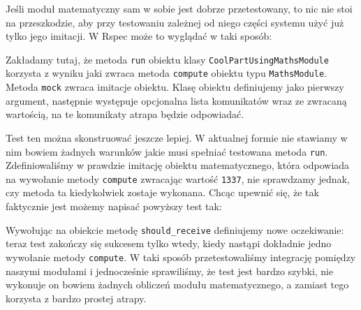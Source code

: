     Jeśli moduł matematyczny sam w sobie jest dobrze przetestowany, to nic nie stoi na przeszkodzie, aby przy testowaniu zależnej od niego części systemu użyć już tylko jego imitacji. W Rspec może to wyglądać w taki sposób:
    
    
    
    Zakładamy tutaj, że metoda \verb+run+ obiektu klasy \verb+CoolPartUsingMathsModule+ korzysta z wyniku jaki zwraca metoda \verb+compute+ obiektu typu \verb+MathsModule+. Metoda \verb+mock+ zwraca imitacje obiektu. Klasę obiektu definiujemy jako pierwszy argument, następnie występuje opcjonalna lista komunikatów wraz ze zwracaną wartością, na te komunikaty atrapa będzie odpowiadać.
    
    Test ten można skonstruować jeszcze lepiej. W aktualnej formie nie stawiamy w nim bowiem żadnych warunków jakie musi spełniać testowana metoda \verb+run+. Zdefiniowaliśmy w prawdzie imitację obiektu matematycznego, która odpowiada na wywołanie metody \verb+compute+ zwracając wartość \verb+1337+, nie sprawdzamy jednak, czy metoda ta kiedykolwiek zostaje wykonana. Chcąc upewnić się, że tak faktycznie jest możemy napisać powyższy test tak:
    
    

    
    Wywołując na obiekcie metodę \verb+should_receive+ definiujemy nowe oczekiwanie: teraz test zakończy się sukcesem tylko wtedy, kiedy nastąpi dokładnie jedno wywołanie metody \verb+compute+. W taki sposób przetestowaliśmy integrację pomiędzy naszymi modułami i jednocześnie sprawiliśmy, że test jest bardzo szybki, nie wykonuje on bowiem żadnych obliczeń modułu matematycznego, a zamiast tego korzysta z bardzo prostej atrapy.